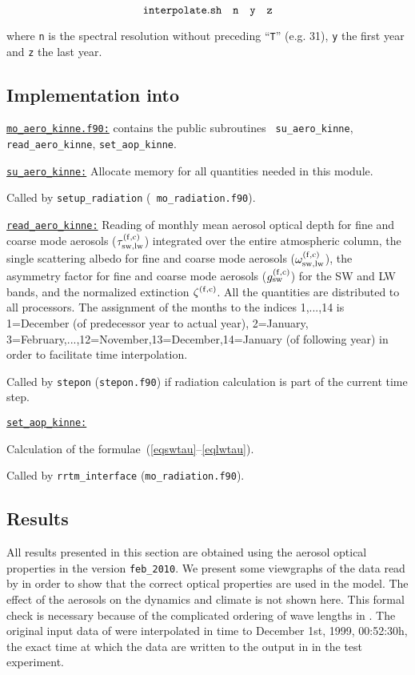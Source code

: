 \begin{appendix}
\begin{equation*}
{\tt interpolate.sh \quad n \quad y \quad z}
\end{equation*}

where {\tt n} is the spectral resolution without preceding ``{\tt T}''
(e.g. 31), {\tt y} the
first year and {\tt z} the last year.

\subsection[Implementation into \echambw]{Implementation into \echam}

\underline{\tt mo\_aero\_kinne.f90:} contains the public subroutines {\tt
  su\_aero\_kinne}, {\tt 
  read\_aero\_kinne}, {\tt set\_aop\_kinne}.

\underline{\tt su\_aero\_kinne:} Allocate memory for all quantities
needed in this module. 

Called by {\tt setup\_radiation} ({\tt
  mo\_radiation.f90}). 

\underline{\tt read\_aero\_kinne:}
Reading of monthly mean aerosol
optical depth for fine and coarse
mode aerosols ($\tau^{\rm (f,c)}_{\rm sw,lw}$) integrated over the
entire atmospheric 
column, the single scattering albedo for
fine and coarse mode aerosols ($\omega^{\rm (f,c)}_{\rm sw,lw}$), the
asymmetry factor for fine and coarse mode aerosols ($g^{\rm
  (f,c)}_{\rm sw}$) for the SW and LW bands, and the normalized extinction
$\zeta^{\rm (f,c)}$.
All the quantities are distributed to all processors. The assignment
of the months to the indices 1,...,14 is 1=December (of predecessor
year to actual year), 2=January,
3=February,...,12=November,13=December,14=January (of following year)
in order to 
facilitate time interpolation.

Called by {\tt stepon} ({\tt stepon.f90}) if radiation calculation is
part of the current time step.

\underline{\tt set\_aop\_kinne:} 

Calculation of the formulae~(\ref{eqswtau}--\ref{eqlwtau}).

Called by {\tt rrtm\_interface} ({\tt mo\_radiation.f90}). 

\subsection{Results}

All results presented in this section are obtained using the aerosol
optical properties in the version {\tt feb\_2010}.
We present some viewgraphs of the data read by \echam{} in order to show
that the correct optical properties are used in the model. The effect
of the aerosols on the dynamics and climate is not shown here.
This formal check is necessary because of the complicated ordering of wave
lengths in \echam. The original input data of \echam{} were
interpolated in time to December 1st, 1999,
00:52:30h, the exact time at which the data are written to the output in
\echam{} in the test experiment.


\end{appendix}
